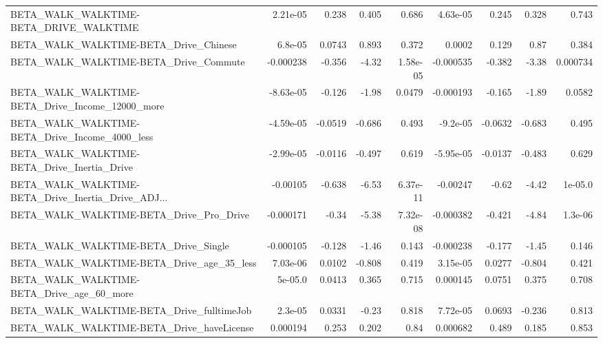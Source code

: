 \begin{tabular}{lrrrrrrrr}
BETA\_WALK\_WALKTIME-BETA\_DRIVE\_WALKTIME             &    2.21e-05 &        0.238 &    0.405 &    0.686 &   4.63e-05 &       0.245 &        0.328 &         0.743 \\
BETA\_WALK\_WALKTIME-BETA\_Drive\_Chinese              &     6.8e-05 &       0.0743 &    0.893 &    0.372 &     0.0002 &       0.129 &         0.87 &         0.384 \\
BETA\_WALK\_WALKTIME-BETA\_Drive\_Commute              &   -0.000238 &       -0.356 &    -4.32 & 1.58e-05 &  -0.000535 &      -0.382 &        -3.38 &      0.000734 \\
BETA\_WALK\_WALKTIME-BETA\_Drive\_Income\_12000\_more    &   -8.63e-05 &       -0.126 &    -1.98 &   0.0479 &  -0.000193 &      -0.165 &        -1.89 &        0.0582 \\
BETA\_WALK\_WALKTIME-BETA\_Drive\_Income\_4000\_less     &   -4.59e-05 &      -0.0519 &   -0.686 &    0.493 &   -9.2e-05 &     -0.0632 &       -0.683 &         0.495 \\
BETA\_WALK\_WALKTIME-BETA\_Drive\_Inertia\_Drive        &   -2.99e-05 &      -0.0116 &   -0.497 &    0.619 &  -5.95e-05 &     -0.0137 &       -0.483 &         0.629 \\
BETA\_WALK\_WALKTIME-BETA\_Drive\_Inertia\_Drive\_ADJ... &    -0.00105 &       -0.638 &    -6.53 & 6.37e-11 &   -0.00247 &       -0.62 &        -4.42 &       1e-05.0 \\
BETA\_WALK\_WALKTIME-BETA\_Drive\_Pro\_Drive            &   -0.000171 &        -0.34 &    -5.38 & 7.32e-08 &  -0.000382 &      -0.421 &        -4.84 &       1.3e-06 \\
BETA\_WALK\_WALKTIME-BETA\_Drive\_Single               &   -0.000105 &       -0.128 &    -1.46 &    0.143 &  -0.000238 &      -0.177 &        -1.45 &         0.146 \\
BETA\_WALK\_WALKTIME-BETA\_Drive\_age\_35\_less          &    7.03e-06 &       0.0102 &   -0.808 &    0.419 &   3.15e-05 &      0.0277 &       -0.804 &         0.421 \\
BETA\_WALK\_WALKTIME-BETA\_Drive\_age\_60\_more          &     5e-05.0 &       0.0413 &    0.365 &    0.715 &   0.000145 &      0.0751 &        0.375 &         0.708 \\
BETA\_WALK\_WALKTIME-BETA\_Drive\_fulltimeJob          &     2.3e-05 &       0.0331 &    -0.23 &    0.818 &   7.72e-05 &      0.0693 &       -0.236 &         0.813 \\
BETA\_WALK\_WALKTIME-BETA\_Drive\_haveLicense          &    0.000194 &        0.253 &    0.202 &     0.84 &   0.000682 &       0.489 &        0.185 &         0.853 \\

\end{tabular}
